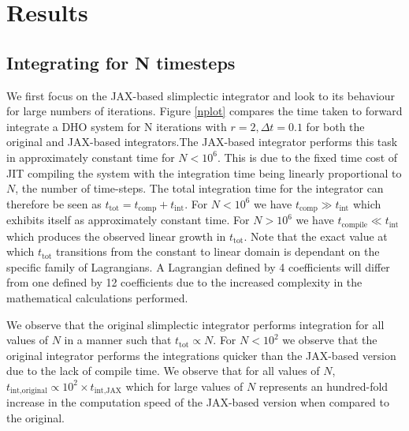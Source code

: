 \documentclass[10pt]{iopart}
\begin{document}
\section{Results}
\subsection{Integrating for N timesteps}
We first focus on the JAX-based slimplectic integrator and look to its behaviour for large numbers of iterations. Figure \ref{nplot} compares the time taken to forward integrate a DHO system for N iterations with $r=2, \Delta t = 0.1$ for both the original and JAX-based integrators.The JAX-based integrator performs this task in approximately constant time for $N<10^6$. This is due to the fixed time cost of JIT compiling the system with the integration time being linearly proportional to $N$, the number of time-steps. The total integration time for the integrator can therefore be seen as $t_{\textrm{tot}} = t_{\textrm{comp}} + t_{\textrm{int}}$. For $N<10^6$ we have $t_{\textrm{comp}} \gg t_{\textrm{int}}$ which exhibits itself as approximately constant time. For $N > 10^6$ we have $t_{\textrm{compile}} \ll t_{\textrm{int}}$ which produces the observed linear growth in $t_{\textrm{tot}}$.
Note that the exact value at which $t_{\textrm{tot}}$ transitions from the constant to linear domain is dependant on the specific family of Lagrangians. A Lagrangian defined by 4 coefficients will differ from one defined by 12 coefficients due to the increased complexity in the mathematical calculations performed.

We observe that the original slimplectic integrator performs integration for all values of $N$ in a manner such that $t_{\textrm{tot}} \propto N$. For $N<10^2$ we observe that the original integrator performs the integrations quicker than the JAX-based version due to the lack of compile time. We observe that for all values of $N$, $t_{\textrm{int,original}} \propto 10^2\times t_{\textrm{int,JAX}}$ which for large values of $N$ represents an hundred-fold increase in the computation speed of the JAX-based version when compared to the original.
\end{document}
